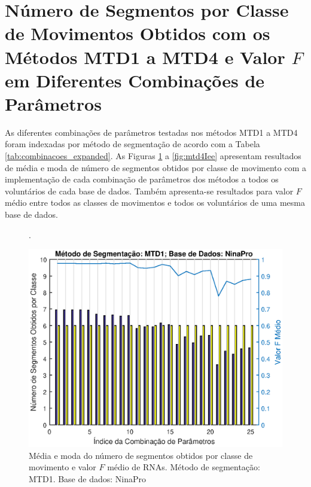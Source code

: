		\section{Número de Segmentos por Classe de Movimentos Obtidos com os Métodos MTD1 a MTD4 e Valor $F$ em Diferentes Combinações de Parâmetros}
As diferentes combinações de parâmetros testadas nos métodos MTD1 a MTD4 foram indexadas por método de segmentação de acordo com a Tabela \ref{tab:combinacoes_expanded}. As Figuras \ref{fig:mtd1Nina} a \ref{fig:mtd4Iee} apresentam resultados de média e moda de número de segmentos obtidos por classe de movimento com a implementação de cada combinação de parâmetros dos métodos a todos os voluntários de cada base de dados. Também apresenta-se resultados para valor $F$ médio entre todos as classes de movimentos e todos os voluntários de uma mesma base de dados.



\begin{figure}[htb]
	\caption{\label{fig:mtd1Nina}Média e moda do número de segmentos obtidos por classe de movimento e valor $F$ médio de RNAs. Método de segmentação: MTD1. Base de dados: NinaPro}.
	\begin{center}
	    \includegraphics[width=0.75\linewidth]{./img/matlab/results/mtd1_nina.eps}
	\end{center}
\end{figure}

